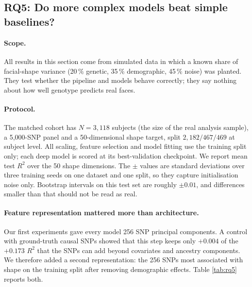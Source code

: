 
\subsection{RQ5: Do more complex models beat simple baselines?}
\label{sec:rq5}

\paragraph{Scope.}
All results in this section come from simulated data in which a known share of
facial-shape variance (20\,\% genetic, 35\,\% demographic, 45\,\% noise) was
planted. They test whether the pipeline and models behave correctly; they say
nothing about how well genotype predicts real faces.

\paragraph{Protocol.}
The matched cohort has $N=3{,}118$ subjects (the size of the real analysis
sample), a 5{,}000-SNP panel and a 50-dimensional shape target, split
$2{,}182/467/469$ at subject level. All scaling, feature selection and model
fitting use the training split only; each deep model is scored at its
best-validation checkpoint. We report mean test $R^2$ over the 50 shape
dimensions. The $\pm$ values are standard deviations over three training seeds
on one dataset and one split, so they capture initialisation noise only.
Bootstrap intervals on this test set are roughly $\pm0.01$, and differences
smaller than that should not be read as real.

\paragraph{Feature representation mattered more than architecture.}
Our first experiments gave every model 256 SNP principal components. A control
with ground-truth causal SNPs showed that this step keeps only $+0.004$ of the
$+0.173$ $R^2$ that the SNPs can add beyond covariates and ancestry components.
We therefore added a second representation: the 256 SNPs most associated with
shape on the training split after removing demographic effects. Table
\ref{tab:rq5} reports both.

